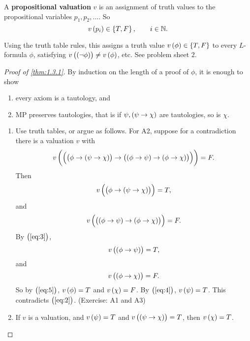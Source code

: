 \begin{definition}
A \textbf{propositional valuation} $ v $ is an assignment of truth values to the propositional variables $ p_1, p_2, \dots $. So
$$ v\br{p_i} \in \cbr{T, F}, \qquad i \in \N. $$
\end{definition}

\begin{note*}
Using the truth table rules, this assigns a truth value $ v\br{\phi} \in \cbr{T, F} $ to every $ L $-formula $ \phi $, satisfying $ v\br{\notb{\phi}} \ne v\br{\phi} $, etc. See problem sheet $ 2 $.
\end{note*}

\begin{proof}[Proof of \ref{thm:1.3.1}]
By induction on the length of a proof of $ \phi $, it is enough to show
\begin{enumerate}
\item every axiom is a tautology, and
\item MP preserves tautologies, that is if $ \psi, \impb{\psi}{\chi} $ are tautologies, so is $ \chi $.
\end{enumerate}
\begin{enumerate}
\item Use truth tables, or argue as follows. For A2, suppose for a contradiction there is a valuation $ v $ with
$$ v\br{\impb{\impb{\phi}{\impb{\psi}{\chi}}}{\impb{\impb{\phi}{\psi}}{\impb{\phi}{\chi}}}} = F. $$
Then
\begin{equation}
\label{eq:2}
v\br{\impb{\phi}{\impb{\psi}{\chi}}} = T,
\end{equation}
and
\begin{equation}
\label{eq:3}
v\br{\impb{\impb{\phi}{\psi}}{\impb{\phi}{\chi}}} = F.
\end{equation}
By $ \br{\ref{eq:3}} $,
\begin{equation}
\label{eq:4}
v\br{\impb{\phi}{\psi}} = T,
\end{equation}
and
\begin{equation}
\label{eq:5}
v\br{\impb{\phi}{\chi}} = F.
\end{equation}
So by $ \br{\ref{eq:5}} $, $ v\br{\phi} = T $ and $ v\br{\chi} = F $. By $ \br{\ref{eq:4}} $, $ v\br{\psi} = T $. This contradicts $ \br{\ref{eq:2}} $. (Exercise: A1 and A3)
\item If $ v $ is a valuation, and $ v\br{\psi} = T $ and $ v\br{\impb{\psi}{\chi}} = T $, then $ v\br{\chi} = T $.
\end{enumerate}
\end{proof}

